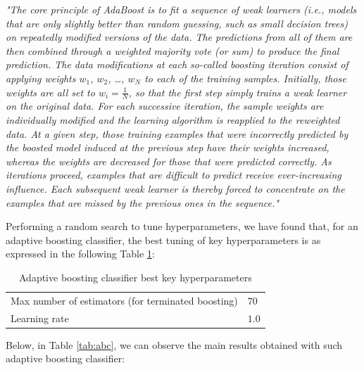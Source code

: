 \documentclass[twocolumn, switch]{article}
\begin{document}
\textit{"The core principle of AdaBoost is to fit a sequence of weak learners (i.e., models that are only slightly better than random guessing, such as small decision trees) on repeatedly modified versions of the data. The predictions from all of them are then combined through a weighted majority vote (or sum) to produce the final prediction. The data modifications at each so-called boosting iteration consist of applying weights $w_1$, $w_2$, \ldots, $w_N$ to each of the training samples. Initially, those weights are all set to $w_i = \frac{1}{N}$, so that the first step simply trains a weak learner on the original data. For each successive iteration, the sample weights are individually modified and the learning algorithm is reapplied to the reweighted data. At a given step, those training examples that were incorrectly predicted by the boosted model induced at the previous step have their weights increased, whereas the weights are decreased for those that were predicted correctly. As iterations proceed, examples that are difficult to predict receive ever-increasing influence. Each subsequent weak learner is thereby forced to concentrate on the examples that are missed by the previous ones in the sequence."}

Performing a random search to tune hyperparameters, we have found that, for an adaptive boosting classifier, the best tuning of key hyperparameters is as expressed in the following Table \ref{tab:abchyp}:

\begin{table}[H]
\caption{Adaptive boosting classifier best key hyperparameters}
\centering
\begin{tabular}{ll}
\toprule
Max number of estimators (for terminated boosting) & $70$ \\
Learning rate & $1.0$ \\
\bottomrule
\end{tabular}
\label{tab:abchyp}
\end{table}

Below, in Table \ref{tab:abc}, we can observe the main results obtained with such adaptive boosting classifier:
\end{document}
